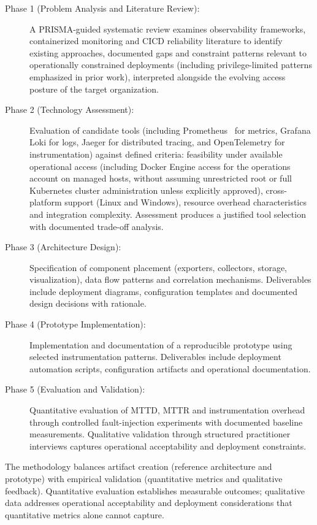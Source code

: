 \begin{description}
    \item[Phase 1 (Problem Analysis and Literature Review):] A PRISMA-guided systematic review examines observability frameworks, containerized monitoring and \ac{CICD} reliability literature to identify existing approaches, documented gaps and constraint patterns relevant to operationally constrained deployments (including privilege-limited patterns emphasized in prior work), interpreted alongside the evolving access posture of the target organization.
    \item[Phase 2 (Technology Assessment):] Evaluation of candidate tools (including Prometheus~\cite{prometheus2016} for metrics, Grafana Loki for logs, Jaeger for distributed tracing, and \gls{OpenTelemetry} for instrumentation) against defined criteria: feasibility under available operational access (including Docker Engine access for the operations account on managed hosts, without assuming unrestricted root or full Kubernetes cluster administration unless explicitly approved), cross-platform support (Linux and Windows), resource overhead characteristics and integration complexity. Assessment produces a justified tool selection with documented trade-off analysis.
    \item[Phase 3 (Architecture Design):] Specification of component placement (exporters, collectors, storage, visualization), data flow patterns and correlation mechanisms. Deliverables include deployment diagrams, configuration templates and documented design decisions with rationale.
    \item[Phase 4 (Prototype Implementation):] Implementation and documentation of a reproducible prototype using selected instrumentation patterns. Deliverables include deployment automation scripts, configuration artifacts and operational documentation.
    \item[Phase 5 (Evaluation and Validation):] Quantitative evaluation of \ac{MTTD}, \ac{MTTR} and instrumentation overhead through controlled fault-injection experiments with documented baseline measurements. Qualitative validation through structured practitioner interviews captures operational acceptability and deployment constraints.
\end{description}

The methodology balances artifact creation (reference architecture and prototype) with empirical validation (quantitative metrics and qualitative feedback). Quantitative evaluation establishes measurable outcomes; qualitative data addresses operational acceptability and deployment considerations that quantitative metrics alone cannot capture.

